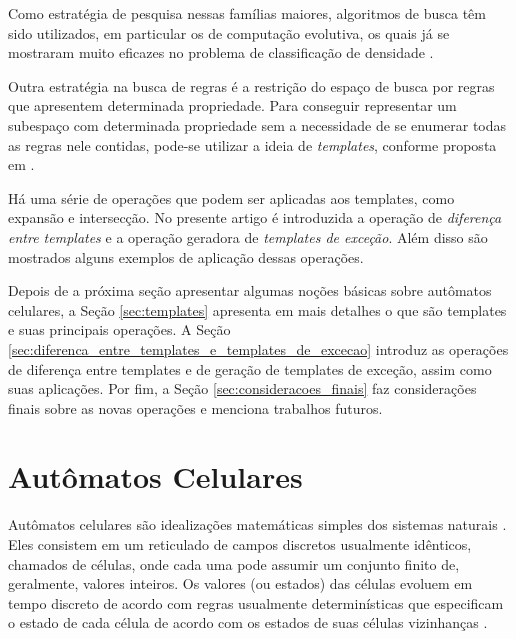 \documentclass[12pt, a4paper]{article}
\begin{document}
Como estratégia de pesquisa nessas famílias maiores, algoritmos de busca têm sido utilizados, em particular os de computação evolutiva, os quais já se mostraram muito eficazes no problema de classificação de densidade \cite{wolz2008very}.

Outra estratégia na busca de regras é a restrição do espaço de busca por regras que apresentem determinada propriedade. Para conseguir representar um subespaço com determinada propriedade sem a necessidade de se enumerar todas as regras nele contidas, pode-se utilizar a ideia de \textit{templates}, conforme proposta em \cite{deOliveira2014,deOliveira2014b}.

Há uma série de operações que podem ser aplicadas aos templates, como expansão e intersecção. No presente artigo é introduzida a operação de \textit{diferença entre templates} e a operação geradora de \textit{templates de exceção}. Além disso são mostrados alguns exemplos de aplicação dessas operações.

Depois de a próxima seção apresentar algumas noções básicas sobre autômatos celulares, a Seção \ref{sec:templates}
 apresenta em mais detalhes o que são templates e suas principais operações. A Seção \ref{sec:diferenca_entre_templates_e_templates_de_excecao}
 introduz as operações de diferença entre templates e de geração de templates de exceção, assim como suas aplicações. Por fim, a Seção \ref{sec:consideracoes_finais} faz considerações finais sobre as novas operações e menciona trabalhos futuros.

\section{Autômatos Celulares}
\label{sec:automatos_celulares}
Autômatos celulares são idealizações matemáticas simples dos sistemas naturais \cite{wolfram1994cellular}. Eles consistem em um reticulado de campos discretos usualmente idênticos, chamados de células, onde cada uma pode assumir um conjunto finito de, geralmente, valores inteiros. Os valores (ou estados) das células evoluem em tempo discreto de acordo com regras usualmente determinísticas que especificam o estado de cada célula de acordo com os estados de suas células vizinhanças \cite{wolfram1994cellular}.
\end{document}
